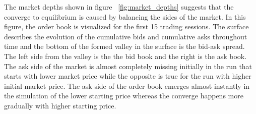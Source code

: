 The market depths shown in figure ~\ref{fig:market_depths} suggests that the
converge to equilibrium is caused by balancing the sides of the market. 
In this figure, the order book is visualized for the first 15 trading sessions. 
The surface describes the evolution of the cumulative bids and cumulative asks 
throughout time and the bottom of the formed valley in the surface is the bid-ask spread. 
The left side from the valley is the the bid book and the right is the ask book. The 
ask side of the market is almost completely missing initially in the run that
starts with lower market price while the opposite is true for the run with higher
initial market price. The ask side of the order book emerges almost instantly 
in the simulation of the lower starting price whereas the converge happens more 
gradually with higher starting price.


